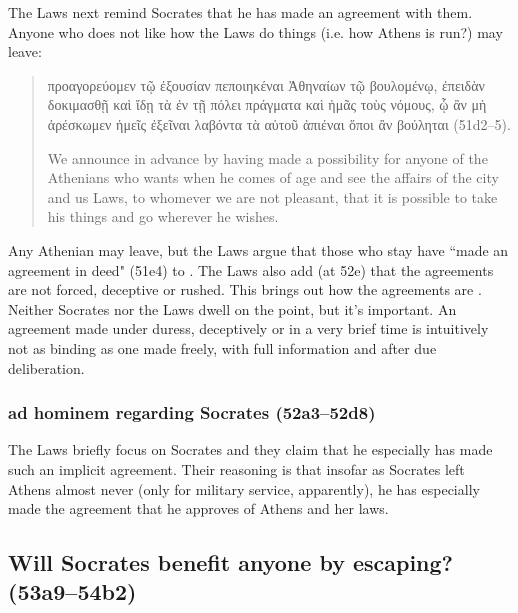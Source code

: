 \documentclass[11pt]{article}
\begin{document}
The Laws next remind Socrates that he has made an agreement with them.
Anyone who does not like how the Laws do things (i.e. how Athens is run?)
may leave:

\begin{quote}

    {\g
    προαγορεύομεν τῷ ἐξουσίαν πεποιηκέναι Ἀθηναίων τῷ βουλομένῳ, ἐπειδὰν
    δοκιμασθῇ καὶ ἴδῃ τὰ ἐν τῇ πόλει πράγματα καὶ ἡμᾶς τοὺς νόμους, ᾧ ἂν μὴ
    ἀρέσκωμεν ἡμεῖς ἐξεῖναι λαβόντα τὰ αὑτοῦ ἀπιέναι ὅποι ἂν βούληται
    } (51d2--5).

    We announce in advance by having made a possibility for anyone of the
    Athenians who wants when he comes of age and see the affairs of the
    city and us Laws, to whomever we are not pleasant, that it is possible
    to take his things and go wherever he wishes.

\end{quote}

Any Athenian may leave, but the Laws argue that those who stay have ``made
an agreement in deed" (51e4) to .  The Laws also
add (at 52e) that the agreements are not forced, deceptive or rushed.  This
brings out how the agreements are .  Neither Socrates nor the
Laws dwell on the point, but it's important.  An agreement made under
duress, deceptively or in a very brief time is intuitively not as binding
as one made freely, with full information and after due deliberation.


\subsubsection{ad hominem regarding Socrates (52a3--52d8)}

The Laws briefly focus on Socrates and they claim that he especially has
made such an implicit agreement.  Their reasoning is that insofar as
Socrates left Athens almost never (only for military service, apparently),
he has especially made the  agreement that he approves of
Athens and her laws.


\subsection{Will Socrates benefit anyone by escaping? (53a9--54b2)}
\end{document}
